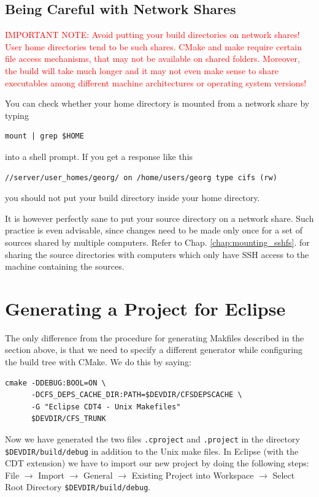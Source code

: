 

\subsection{Being Careful with Network Shares}
\label{sec:being_careful_with_shares}
\textcolor{red}{IMPORTANT  NOTE:  Avoid  putting  your  build  directories  on
network shares! User home directories tend  to be such shares.  CMake and make
require certain  file access mechanisms, that  may not be  available on shared
folders. Moreover,  the build will take much  longer and it may  not even make
sense to share executables  among different machine architectures or operating
system versions!}

You can check  whether your home directory is mounted from  a network share by
typing
\begin{verbatim}
mount | grep $HOME
\end{verbatim}
into a shell prompt. If you get a response like this
\begin{verbatim}
//server/user_homes/georg/ on /home/users/georg type cifs (rw)
\end{verbatim}
you should not put your build directory inside your home directory.

It is however perfectly sane to  put your source directory on a network share.
Such practice is even advisable, since changes need to be made only once for a
set   of   sources   shared   by   multiple   computers.    Refer   to   Chap.
\ref{chap:mounting_sshfs}.  for sharing  the source directories with computers
which only have SSH access to the machine containing the sources.

\section{Generating a Project for Eclipse}
\label{sec:eclipse_setup_project}

The only  difference from the  procedure for generating Makfiles  described in
the section  above, is  that we  need to specify  a different  generator while
configuring the build tree with CMake. We do this by saying:

\begin{verbatim}
cmake -DDEBUG:BOOL=ON \ 
      -DCFS_DEPS_CACHE_DIR:PATH=$DEVDIR/CFSDEPSCACHE \ 
      -G "Eclipse CDT4 - Unix Makefiles" 
      $DEVDIR/CFS_TRUNK
\end{verbatim}

Now we have generated the two  files {\tt .cproject} and {\tt .project} in the
directory {\tt  \$DEVDIR\-/build\-/debug} in addition to the  Unix make files.
In Eclipse (with the CDT extension) we have to import our new project by doing
the   following  steps:  File   $\rightarrow$  Import   $\rightarrow$  General
$\rightarrow$  Existing  Project  into  Workspace  $\rightarrow$  Select  Root
Directory {\tt \$DEVDIR\-/build\-/debug}.

